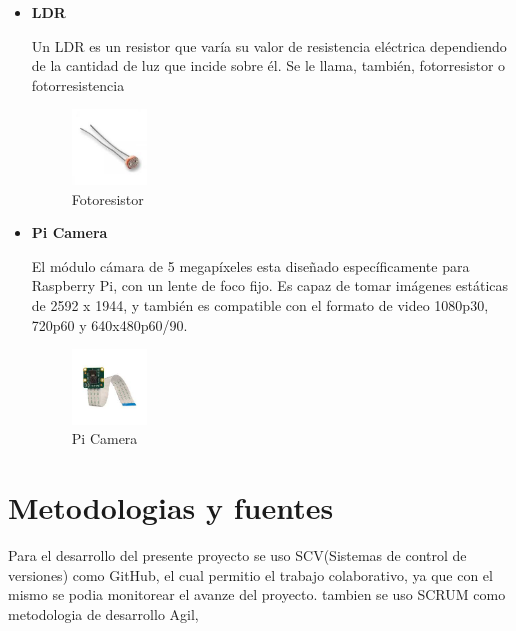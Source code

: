 \documentclass[letterpaper,12pt]{article}
\begin{document}
{\begin{itemize}
\begin{figure}[h]
	\end{figure}

	
	\item \textbf{LDR}

	Un LDR es un resistor que varía su valor de resistencia eléctrica dependiendo de la cantidad de luz que incide sobre él. Se le llama, también, fotorresistor o fotorresistencia

	\begin{figure}[h]
		\centering
		\begin{minipage}[t]{4cm}
			\includegraphics[width=2cm]{images/ldr.jpeg}	 %
			\caption{Fotoresistor }
		\end{minipage}
		
	\end{figure}
	
	\item \textbf{Pi Camera}
	
	El módulo cámara de 5 megapíxeles esta diseñado específicamente para Raspberry Pi, con un lente de foco fijo. Es capaz de tomar imágenes estáticas de 2592 x 1944, y también es compatible con el formato de video 1080p30, 720p60 y 640x480p60/90.
	
	\begin{figure}[h]
		\centering
		\begin{minipage}[t]{4cm}
			\includegraphics[width=2cm]{images/camerapi.jpeg}	 %
			\caption{Pi Camera }
		\end{minipage}
		
	\end{figure}
	

\end{itemize}

\section{Metodologias y fuentes}

 
Para el desarrollo del presente proyecto se uso SCV(Sistemas de control de versiones) como GitHub, el cual permitio el trabajo colaborativo, ya que con el mismo se podia monitorear el avanze del proyecto. tambien se uso SCRUM como metodologia de desarrollo Agil, 

}
\end{document}
